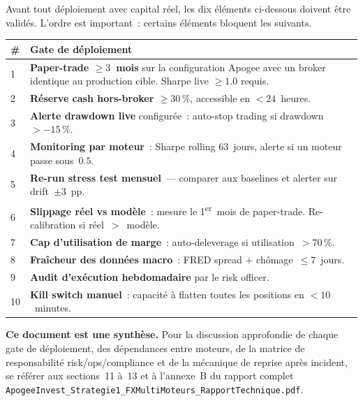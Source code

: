 \documentclass[11pt, a4paper]{scrartcl}
\begin{document}
Avant tout déploiement avec capital réel, les dix éléments ci-dessous doivent être
validés. L'ordre est important~: certains éléments bloquent les suivants.

\vspace{0.3em}

\begin{center}
\small
\begin{tabular}{@{}p{0.4cm}p{13.5cm}@{}}
\toprule
\textbf{\#} & \textbf{Gate de déploiement} \\
\midrule
1  & \textbf{Paper-trade $\geq 3$~mois} sur la configuration Apogee avec un broker
identique au production cible. Sharpe live $\geq 1.0$ requis. \\
2  & \textbf{Réserve cash hors-broker $\geq 30\,\%$}, accessible en $< 24$~heures. \\
3  & \textbf{Alerte drawdown live} configurée~: auto-stop trading si drawdown $>-15\,\%$. \\
4  & \textbf{Monitoring par moteur}~: Sharpe rolling 63~jours, alerte si un moteur
passe sous~$0.5$. \\
5  & \textbf{Re-run stress test mensuel}~--- comparer aux baselines et alerter sur
drift~$\pm 3$~pp. \\
6  & \textbf{Slippage réel vs modèle}~: mesure le 1\textsuperscript{er}~mois de
paper-trade. Re-calibration si réel~$>$~modèle. \\
7  & \textbf{Cap d'utilisation de marge}~: auto-deleverage si utilisation~$> 70\,\%$. \\
8  & \textbf{Fraîcheur des données macro}~: FRED spread + chômage~$\leq 7$~jours. \\
9  & \textbf{Audit d'exécution hebdomadaire} par le risk officer. \\
10 & \textbf{Kill switch manuel}~: capacité à flatten toutes les positions en
$< 10$~minutes. \\
\bottomrule
\end{tabular}
\end{center}

\vspace{0.3em}

\begin{warningbox}
\textbf{Ce document est une synthèse.} Pour la discussion approfondie de chaque
gate de déploiement, des dépendances entre moteurs, de la matrice de responsabilité
risk/ops/compliance et de la mécanique de reprise après incident, se référer aux
sections~11 à~13 et à l'annexe~B du rapport complet \texttt{ApogeeInvest\_Strategie1\_FXMultiMoteurs\_RapportTechnique.pdf}.
\end{warningbox}
\end{document}
